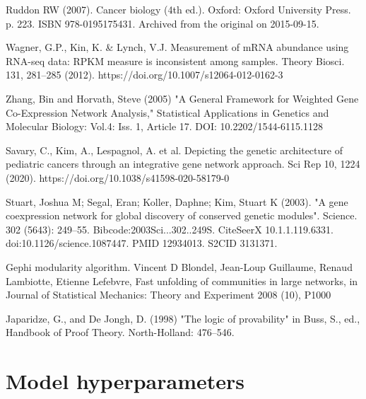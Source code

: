 \documentclass[12pt,a4paper]{report}
\begin{document}
\begin{thebibliography}{HHM99}
Ruddon RW (2007). Cancer biology (4th ed.). Oxford: Oxford University Press. p. 223. ISBN 978-0195175431. Archived from the original on 2015-09-15.

Wagner, G.P., Kin, K. & Lynch, V.J. Measurement of mRNA abundance using RNA-seq data: RPKM measure is inconsistent among samples. Theory Biosci. 131, 281–285 (2012). https://doi.org/10.1007/s12064-012-0162-3


Zhang, Bin and Horvath, Steve (2005) "A General Framework for Weighted Gene Co-Expression Network Analysis," Statistical Applications in Genetics and Molecular Biology: Vol.4: Iss. 1, Article 17. DOI: 10.2202/1544-6115.1128

Savary, C., Kim, A., Lespagnol, A. et al. Depicting the genetic architecture of pediatric cancers through an integrative gene network approach. Sci Rep 10, 1224 (2020). https://doi.org/10.1038/s41598-020-58179-0

Stuart, Joshua M; Segal, Eran; Koller, Daphne; Kim, Stuart K (2003). "A gene coexpression network for global discovery of conserved genetic modules". Science. 302 (5643): 249–55. Bibcode:2003Sci...302..249S. CiteSeerX 10.1.1.119.6331. doi:10.1126/science.1087447. PMID 12934013. S2CID 3131371.

Gephi modularity algorithm. Vincent D Blondel, Jean-Loup Guillaume, Renaud Lambiotte, Etienne Lefebvre, Fast unfolding of communities in large networks, in Journal of Statistical Mechanics: Theory and Experiment 2008 (10), P1000

Japaridze, G., and De Jongh, D. (1998) "The logic of provability" in Buss, S., ed., Handbook of Proof Theory. North-Holland: 476–546.

  
  
  
\end{thebibliography}

\chapter{Model hyperparameters}
\end{document}
